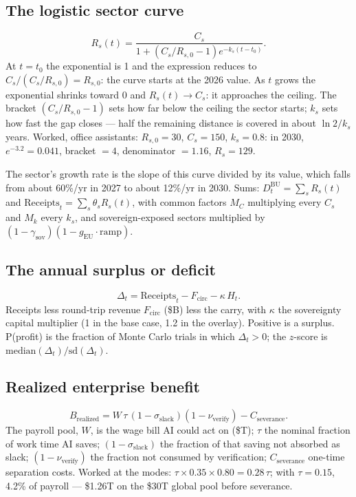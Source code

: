 \documentclass[11pt,letterpaper]{article}
\begin{document}
\subsection*{The logistic sector curve}
\[R_s(t)=\frac{C_s}{1+\left(C_s/R_{s,0}-1\right)e^{-k_s(t-t_0)}}.\]
At $t=t_0$ the exponential is 1 and the expression reduces to $C_s/(C_s/R_{s,0})=R_{s,0}$: the curve starts at the 2026 value. As $t$ grows the exponential shrinks toward 0 and $R_s(t)\to C_s$: it approaches the ceiling. The bracket $(C_s/R_{s,0}-1)$ sets how far below the ceiling the sector starts; $k_s$ sets how fast the gap closes --- half the remaining distance is covered in about $\ln 2/k_s$ years. Worked, office assistants: $R_{s,0}=30$, $C_s=150$, $k_s=0.8$: in 2030, $e^{-3.2}=0.041$, bracket $=4$, denominator $=1.16$, $R_s=129$.

The sector's growth rate is the slope of this curve divided by its value, which falls from about 60\%/yr in 2027 to about 12\%/yr in 2030. Sums: $D^{\text{BU}}_t=\sum_s R_s(t)$ and $\text{Receipts}_t=\sum_s\theta_sR_s(t)$, with common factors $M_C$ multiplying every $C_s$ and $M_k$ every $k_s$, and sovereign-exposed sectors multiplied by $(1-\gamma_{\text{sov}})(1-g_{\text{EU}}\cdot\text{ramp})$.

\subsection*{The annual surplus or deficit}
\[\Delta_t=\text{Receipts}_t-F_{\text{circ}}-\kappa\,H_t.\]
Receipts less round-trip revenue $F_{\text{circ}}$ (\$B) less the carry, with $\kappa$ the sovereignty capital multiplier (1 in the base case, 1.2 in the overlay). Positive is a surplus. P(profit) is the fraction of Monte Carlo trials in which $\Delta_t>0$; the $z$-score is $\text{median}(\Delta_t)/\text{sd}(\Delta_t)$.

\subsection*{Realized enterprise benefit}
\[B_{\text{realized}}=W\,\tau\,(1-\sigma_{\text{slack}})(1-\nu_{\text{verify}})-C_{\text{severance}}.\]
The payroll pool, $W$, is the wage bill AI could act on (\$T); $\tau$ the nominal fraction of work time AI saves; $(1-\sigma_{\text{slack}})$ the fraction of that saving not absorbed as slack; $(1-\nu_{\text{verify}})$ the fraction not consumed by verification; $C_{\text{severance}}$ one-time separation costs. Worked at the modes: $\tau\times0.35\times0.80=0.28\,\tau$; with $\tau=0.15$, 4.2\% of payroll --- \$1.26T on the \$30T global pool before severance.
\end{document}
